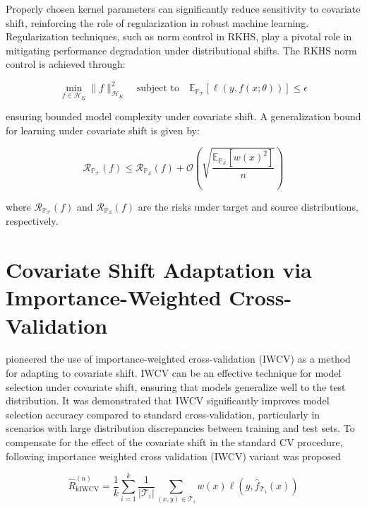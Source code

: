 Properly chosen kernel parameters can significantly reduce sensitivity to covariate shift, reinforcing the role of regularization in robust machine learning. Regularization techniques, such as norm control in RKHS, play a pivotal role in mitigating performance degradation under distributional shifts. The RKHS norm control is achieved through:

\begin{equation}
    \min_{f \in \mathcal{H}_K} \lVert f \rVert_{\mathcal{H}_K}^2 \quad \text{subject to} \quad \mathbb{E}_{\mathbb{P}_{\mathcal{T}}}[\ell (y, f(x; \theta))] \leq \epsilon
    \label{eqn:5.3}
\end{equation}

ensuring bounded model complexity under covariate shift. A generalization bound for learning under covariate shift is given by:

\begin{equation}
    \mathcal{R}_{\mathbb{P}_{\mathcal{T}}}(f) \leq \mathcal{R}_{\mathbb{P}_{\mathcal{S}}}(f) + \mathcal{O} \left( \sqrt{\frac{\mathbb{E}_{\mathbb{P}_{\mathcal{S}}}[w(x)^2]}{n}} \right)
    \label{eqn:5.4}
\end{equation}

where $\mathcal{R}_{\mathbb{P}_{\mathcal{T}}}(f)$ and $\mathcal{R}_{\mathbb{P}_{\mathcal{S}}}(f)$ are the risks under target and source distributions, respectively.

\section{Covariate Shift Adaptation via Importance-Weighted Cross-Validation}

\citep{sugiyama2000covariate} pioneered the use of importance-weighted cross-validation (IWCV) as a method for adapting to covariate shift. IWCV can be an effective technique for model selection under covariate shift, ensuring that models generalize well to the test distribution. It was demonstrated that IWCV significantly improves model selection accuracy compared to standard cross-validation, particularly in scenarios with large distribution discrepancies between training and test sets. To compensate for the effect of the covariate shift in the standard CV procedure, following importance weighted cross validation (IWCV) variant was proposed

\begin{equation}
    \hat{R}_{\text{kIWCV}}^{(n)} = \frac{1}{k} \sum_{i=1}^k \frac{1}{\lvert \mathcal{T}_i \rvert} \sum_{(x, y) \in \mathcal{T}_i} w(x) \ell(y, \hat{f}_{\mathcal{T}_i}(x))
    \label{eqn:5.5}
\end{equation}


